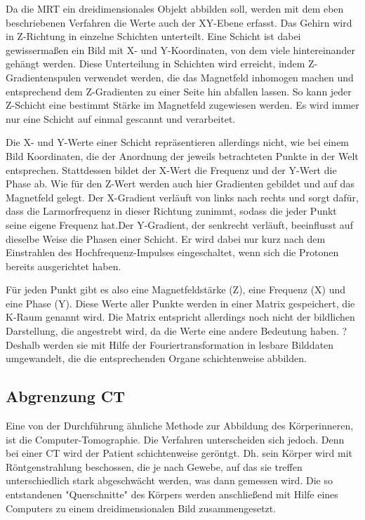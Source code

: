 Da die MRT ein dreidimensionales Objekt abbilden soll, werden mit dem eben beschriebenen Verfahren die Werte auch der XY-Ebene erfasst. Das Gehirn wird in Z-Richtung in einzelne Schichten unterteilt. Eine Schicht ist dabei gewissermaßen ein Bild mit X- und Y-Koordinaten, von dem viele hintereinander gehängt werden. Diese Unterteilung in Schichten wird erreicht, indem Z-Gradientenspulen verwendet werden, die das Magnetfeld inhomogen machen und entsprechend dem Z-Gradienten zu einer Seite hin abfallen lassen. So kann jeder Z-Schicht eine bestimmt Stärke im Magnetfeld zugewiesen werden. 
Es wird immer nur eine Schicht auf einmal gescannt und verarbeitet.

Die X- und Y-Werte einer Schicht repräsentieren allerdings nicht, wie bei einem Bild Koordinaten, die der Anordnung der jeweils betrachteten Punkte in der Welt entsprechen. Stattdessen bildet der X-Wert die Frequenz und der Y-Wert die Phase ab. Wie für den Z-Wert werden auch hier Gradienten gebildet und auf das Magnetfeld gelegt. Der X-Gradient verläuft von links nach rechts und sorgt dafür, dass die Larmorfrequenz in dieser Richtung zunimmt, sodass die jeder Punkt seine eigene Frequenz hat.Der Y-Gradient, der senkrecht verläuft, beeinflusst auf dieselbe Weise die Phasen einer Schicht. Er wird dabei nur kurz nach dem Einstrahlen des Hochfrequenz-Impulses eingeschaltet, wenn sich die Protonen bereits ausgerichtet haben.

Für jeden Punkt gibt es also eine Magnetfeldstärke (Z), eine Frequenz (X) und eine Phase (Y). Diese Werte aller Punkte werden in einer Matrix gespeichert, die K-Raum genannt wird. Die Matrix entspricht allerdings noch nicht der bildlichen Darstellung, die angestrebt wird, da die Werte eine andere Bedeutung haben. ? Deshalb werden sie mit Hilfe der Fouriertransformation in lesbare Bilddaten umgewandelt, die die entsprechenden Organe schichtenweise abbilden. 
\cite{weishaupt09}

\subsection{Abgrenzung CT}
Eine von der Durchführung ähnliche Methode zur Abbildung des Körperinneren, ist die Computer-Tomographie. Die Verfahren unterscheiden sich jedoch. Denn bei einer CT wird der Patient schichtenweise geröntgt. Dh. sein Körper wird mit Röntgenstrahlung beschossen, die je nach Gewebe, auf das sie treffen unterschiedlich stark abgeschwächt werden, was dann gemessen wird. Die so entstandenen "Querschnitte" des Körpers werden anschließend mit Hilfe eines Computers zu einem dreidimensionalen Bild zusammengesetzt. 

